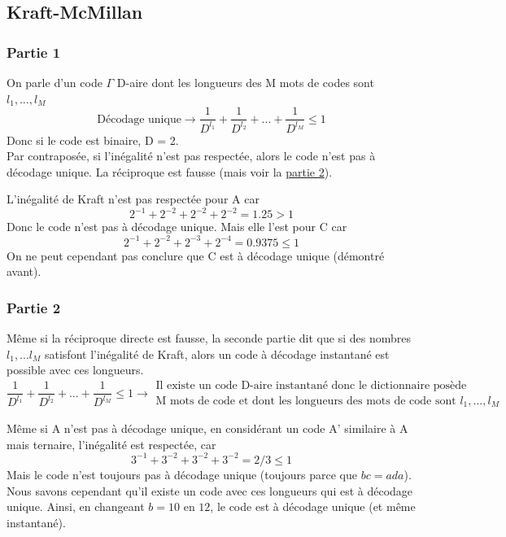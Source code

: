 \documentclass[11pt,a4paper]{article}
\renewcommand{\)}{\right)}
\renewcommand{\(}{\left(}
\begin{document}
\subsection{Kraft-McMillan}
\subsubsection{Partie 1}
On parle d'un code $\Gamma$ D-aire dont les longueurs des M mots de codes sont $l_1,\ldots,l_M$
\begin{equation}
	\text{Décodage unique} \to \frac{1}{D^{l_1}} + \frac{1}{D^{l_2}} + ... + \frac{1}{D^{l_M}} \leq 1
\end{equation}
Donc si le code est binaire, D = 2. \\
Par contraposée, si l'inégalité n'est pas respectée, alors le code n'est pas à décodage unique. La réciproque est fausse (mais voir la \hyperref[partie 2]{partie 2}).
\begin{exemple}
	L'inégalité de Kraft n'est pas respectée pour A car 
	\begin{equation*}
		2^{-1} + 2^{-2} + 2^{-2} + 2^{-2} = 1.25 > 1
	\end{equation*}
	Donc le code n'est pas à décodage unique. Mais elle l'est pour C car 
	\begin{equation*}
		2^{-1} + 2^{-2} + 2^{-3} + 2^{-4} = 0.9375 \leq 1
	\end{equation*}
	On ne peut cependant pas conclure que C est à décodage unique (démontré avant).
\end{exemple}
\subsubsection{Partie 2}
\label{partie 2}
Même si la réciproque directe est fausse, la seconde partie dit que si des nombres $l_1,...l_M$ satisfont l'inégalité de Kraft, alors un code à décodage instantané est possible avec ces longueurs.
\begin{equation*}
	\frac{1}{D^{l_1}} + \frac{1}{D^{l_2}} + ... + \frac{1}{D^{l_M}} \leq 1 \to \substack{\text{Il existe un code D-aire instantané donc le dictionnaire posède}\\ \text{M mots de code  et dont les longueurs des mots de code sont }l_1,...,l_M}
\end{equation*}
\begin{exemple}
	Même si A n'est pas à décodage unique, en considérant un code A' similaire à A mais ternaire, l'inégalité est respectée, car 
	\begin{equation*}
		3^{-1} + 3^{-2} + 3^{-2} + 3^{-2} = 2/3 \leq 1
	\end{equation*}
	Mais le code n'est toujours pas à décodage unique (toujours parce que $bc = ada$). Nous savons cependant qu'il existe un code avec ces longueurs qui est à décodage unique. Ainsi, en changeant $b = 10$ en $12$, le code est à décodage unique (et même instantané).
\end{exemple}
\end{document}
